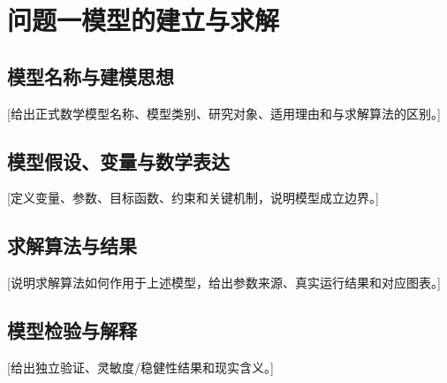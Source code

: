 \section{问题一模型的建立与求解}
\subsection{模型名称与建模思想}
[给出正式数学模型名称、模型类别、研究对象、适用理由和与求解算法的区别。]
\subsection{模型假设、变量与数学表达}
[定义变量、参数、目标函数、约束和关键机制，说明模型成立边界。]
\subsection{求解算法与结果}
[说明求解算法如何作用于上述模型，给出参数来源、真实运行结果和对应图表。]
\subsection{模型检验与解释}
[给出独立验证、灵敏度/稳健性结果和现实含义。]
